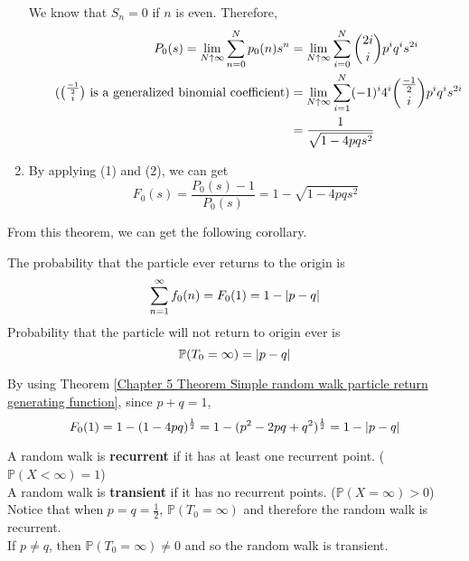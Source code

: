 \documentclass{huhtakm-template-book}
\newcommand{\prob}{\mathbb{P}}
\begin{document}
\begin{proofing}
\begin{enumerate}
            We know that $S_{n}=0$ if $n$ is even. Therefore,
            \begin{align*}
                P_{0}(s)=\lim_{N\uparrow\infty}\sum_{n=0}^{N}p_{0}(n)s^{n}&=\lim_{N\uparrow\infty}\sum_{i=0}^{N}\binom{2i}{i}p^{i}q^{i}s^{2i}\\
                \tag{$\binom{\frac{-1}{2}}{i}$ is a generalized binomial coefficient}
                &=\lim_{N\uparrow\infty}\sum_{i=1}^{N}(-1)^{i}4^{i}\binom{\frac{-1}{2}}{i}p^{i}q^{i}s^{2i}\\
                &=\frac{1}{\sqrt{1-4pqs^{2}}}
            \end{align*}
            \item By applying (1) and (2), we can get
            \begin{equation*}
                F_{0}(s)=\frac{P_{0}(s)-1}{P_{0}(s)}=1-\sqrt{1-4pqs^{2}}
            \end{equation*}
        \end{enumerate}
    \end{proofing}
    From this theorem, we can get the following corollary.
    \begin{cor}
        The probability that the particle ever returns to the origin is
        \begin{equation*}
            \sum_{n=1}^{\infty}f_{0}(n)=F_{0}(1)=1-\left|{p-q}\right|
        \end{equation*}
        Probability that the particle will not return to origin ever is
        \begin{equation*}
            \prob(T_{0}=\infty)=\abs{p-q}
        \end{equation*}
    \end{cor}
    \begin{proofing}
        By using Theorem \ref{Chapter 5 Theorem Simple random walk particle return generating function}, since $p+q=1$,
        \begin{equation*}
            F_{0}(1)=1-(1-4pq)^{\frac{1}{2}}=1-(p^{2}-2pq+q^{2})^{\frac{1}{2}}=1-\left|{p-q}\right|
        \end{equation*}
    \end{proofing}
    \begin{rem}
        A random walk is \textbf{recurrent} if it has at least one recurrent point. ($\prob(X<\infty)=1$)\\
        A random walk is \textbf{transient} if it has no recurrent points. ($\prob(X=\infty)>0$)\\
        Notice that when $p=q=\frac{1}{2}$, $\prob(T_{0}=\infty)$ and therefore the random walk is recurrent.\\
        If $p\neq q$, then $\prob(T_{0}=\infty)\neq 0$ and so the random walk is transient.
    \end{rem}
\end{document}
